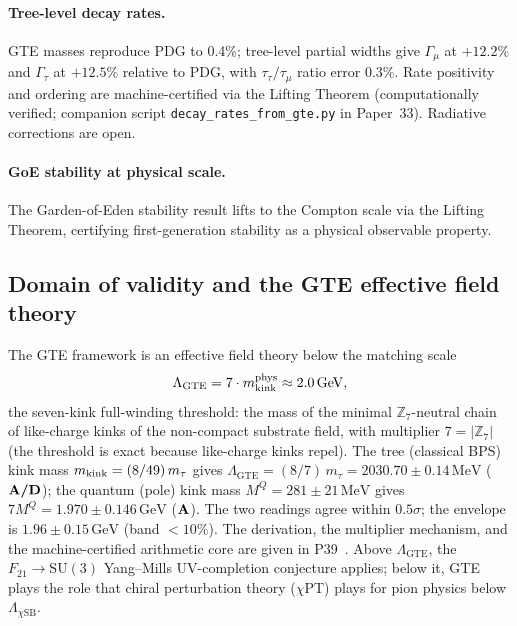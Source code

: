 \paragraph{Tree-level decay rates.}
GTE masses reproduce PDG to 0.4\%; tree-level partial widths give $\Gamma_\mu$ at $+12.2\%$ and $\Gamma_\tau$ at $+12.5\%$ relative to PDG, with $\tau_\tau/\tau_\mu$ ratio error 0.3\%.
Rate positivity and ordering are machine-certified via the Lifting Theorem (computationally verified; companion script \texttt{decay\_rates\_from\_gte.py} in Paper~33).
Radiative corrections are open.

\paragraph{GoE stability at physical scale.}
The Garden-of-Eden stability result lifts to the Compton scale via the Lifting Theorem, certifying first-generation stability as a physical observable property.

\subsection{Domain of validity and the GTE effective field theory}
\label{sec:eft_domain}

The GTE framework is an effective field theory below the matching scale
\begin{equation}
\Lambda_{\mathrm{GTE}} = 7 \cdot m_{\rm kink}^{\rm phys} \approx 2.0\,\mathrm{GeV},
\label{eq:lambda_gte}
\end{equation}
the seven-kink full-winding threshold: the mass of the minimal $\mathbb{Z}_7$-neutral chain of like-charge kinks of the non-compact substrate field, with multiplier $7 = |\mathbb{Z}_7|$ (the threshold is exact because like-charge kinks repel).
The tree (classical BPS) kink mass $m_{\rm kink} = (8/49)\,m_\tau$ gives $\Lambda_{\mathrm{GTE}} = (8/7)\,m_\tau = 2030.70 \pm 0.14\,\mathrm{MeV}$ ($\textbf{A/D}$); the quantum (pole) kink mass $M^Q = 281 \pm 21\,\mathrm{MeV}$ gives $7 M^Q = 1.970 \pm 0.146\,\mathrm{GeV}$ ($\textbf{A}$).
The two readings agree within $0.5\sigma$; the envelope is $1.96 \pm 0.15\,\mathrm{GeV}$ (band $< 10\%$).
The derivation, the multiplier mechanism, and the machine-certified arithmetic core are given in P39~\cite{SpivackGTEQCDStructure}.
Above $\Lambda_{\mathrm{GTE}}$, the $F_{21} \to \mathrm{SU}(3)$ Yang--Mills UV-completion conjecture applies; below it, GTE plays the role that chiral perturbation theory ($\chi$PT) plays for pion physics below $\Lambda_{\chi\mathrm{SB}}$.

